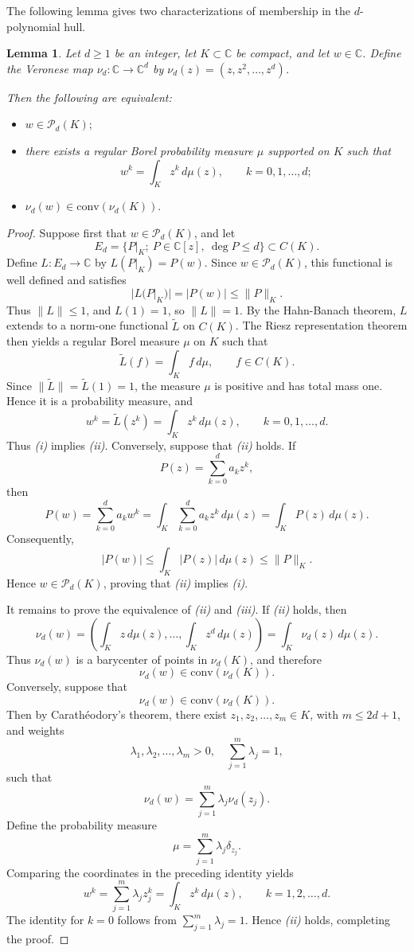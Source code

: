 \documentclass[reqno]{amsart}
\newtheorem{lemma}[theorem]{Lemma}
\theoremstyle{definition}
\newcommand{\C}{\mathbb{C}}
\newcommand{\Conv}{{\mathrm{conv}}}
\newcommand{\cP}{\mathcal{P}}
\numberwithin{equation}{section}
\begin{document}
The following lemma gives two characterizations of membership in the $d$-polynomial hull.
\begin{lemma}\label{L}  Let $d\ge 1$ be an integer, let $K\subset\mathbb{C}$ be compact, and let $w\in\C$. Define the Veronese map $\nu_d:\C\to\C^d$ by $\nu_d(z)=(z,z^2,\ldots,z^d)$. 

Then the following are equivalent:
\begin{itemize}
\item[(i)] $w\in\cP_d(K);$
\item[(ii)] there exists a regular Borel probability measure $\mu$ supported on $K$ such that
\[w^k=\int_K z^k\,d\mu(z),\qquad k=0,1,\ldots,d;\]	
\item[(iii)] $\nu_d(w)\in\Conv(\nu_d(K)).$ 
\end{itemize}
\end{lemma}
\begin{proof}
Suppose first that $w\in\cP_d(K)$, and let 
\[E_d=\{P|_K;\ P\in\C[z],\ \deg P\le d\}\subset C(K).\]
Define $L:E_d\to\C$ by $L(P|_K)=P(w)$. Since $w\in\cP_d(K)$, this functional is well defined and satisfies
\[|L(P|_K)|=|P(w)|\le \|P\|_K.\]
Thus $\|L\|\le 1$, and $L(1)=1$, so $\|L\|=1$. By the Hahn-Banach theorem, $L$ extends to a norm-one functional $\tilde L$ on $C(K)$. The Riesz representation theorem then yields a regular Borel measure $\mu$ on $K$ such that
\[\tilde L(f)=\int_K f\,d\mu,\qquad f\in C(K).\]
Since $\|\tilde L\|=\tilde L(1)=1$, the measure $\mu$ is positive and has total mass one. Hence it is a probability measure, and
\[w^k=\tilde L(z^k)=\int_K z^k\,d\mu(z),\qquad k=0,1,\ldots,d.\]
Thus \emph{(i)} implies \emph{(ii)}.
Conversely, suppose that \emph{(ii)} holds. If
\[P(z)=\sum_{k=0}^d a_kz^k,\]
then
\[P(w)=\sum_{k=0}^d a_kw^k=\int_K\sum_{k=0}^d a_kz^k\,d\mu(z)
=\int_K P(z)\,d\mu(z).
\]
Consequently,
\[|P(w)|\le \int_K |P(z)|\,d\mu(z)\le \|P\|_K.\]
Hence $w\in\cP_d(K)$, proving that \emph{(ii)} implies
\emph{(i)}.

It remains to prove the equivalence of \emph{(ii)} and \emph{(iii)}.
If \emph{(ii)} holds, then
\[\nu_d(w)
=\left(\int_Kz\,d\mu(z),\ldots,\int_Kz^d\,d\mu(z)\right)=
\int_K \nu_d(z)\,d\mu(z).
\]
Thus $\nu_d(w)$ is a barycenter of points in $\nu_d(K)$, and therefore
\[\nu_d(w)\in\Conv(\nu_d(K)).\]
Conversely, suppose that
\[\nu_d(w)\in\Conv(\nu_d(K)).\]
Then by Carath\'eodory's theorem, there exist $z_1,z_2,\ldots,z_m\in K$, with $m\le 2d+1$, and weights
\[\lambda_1,\lambda_2,\ldots,\lambda_m>0,\quad \sum_{j=1}^m \lambda_j=1,\] 
such that
\[\nu_d(w)=\sum_{j=1}^m \lambda_j\nu_d(z_j).
\]
Define the probability measure
\[\mu=\sum_{j=1}^m \lambda_j\delta_{z_j}.\]
Comparing the coordinates in the preceding identity yields
\[w^k=\sum_{j=1}^m \lambda_jz_j^k=\int_Kz^k\,d\mu(z),
\qquad k=1,2,\ldots,d.
\]
The identity for $k=0$ follows from
$\sum_{j=1}^m\lambda_j=1$. Hence \emph{(ii)} holds, completing the proof.
\end{proof}
\end{document}

